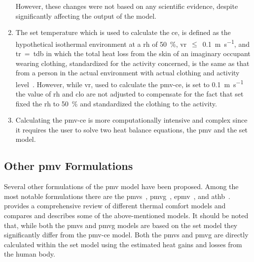 \begin{enumerate}
    However, these changes were not based on any scientific evidence, despite significantly affecting the output of the model.
    \item The \ac{set} temperature which is used to calculate the \ac{ce}, is defined as the hypothetical isothermal environment at a \ac{rh} of \qty{50}{\percent}, \ac{vr}~$\leq$~\qty{0.1}{\m\per\s}, and \ac{tr}~=~\ac{tdb} in which the total heat loss from the skin of an imaginary occupant wearing clothing, standardized for the activity concerned, is the same as that from a person in the actual environment with actual clothing and activity level~\cite{ashrae552023}.
    However, while \ac{vr}, used to calculate the \ac{pmv-ce}, is set to \qty{0.1}{\m\per\s} the value of \ac{rh} and \ac{clo} are not adjusted to compensate for the fact that \ac{set} fixed the \ac{rh} to \qty{50}{\percent} and standardized the clothing to the activity.
    \item Calculating the \ac{pmv-ce} is more computationally intensive and complex since it requires the user to solve two heat balance equations, the \ac{pmv} and the \ac{set} model.
\end{enumerate}

\subsection{Other \ac{pmv} Formulations}\label{subsec:other-pmv-formulations}
Several other formulations of the \ac{pmv} model have been proposed.
Among the most notable formulations there are the \ac{pmvs}~\cite{GaggeSET}, \ac{pmvg}~\cite{GaggeSET},  \ac{epmv}~\cite{Toftum2002}, and \ac{athb}~\cite{Schweiker2022}.
 provides a comprehensive review of different thermal comfort models and compares and describes some of the above-mentioned models.
It should be noted that, while both the \ac{pmvs} and \ac{pmvg} models are based on the \ac{set} model they significantly differ from the \ac{pmv-ce} model.
Both the \ac{pmvs} and \ac{pmvg} are directly calculated within the \ac{set} model using the estimated heat gains and losses from the human body.

